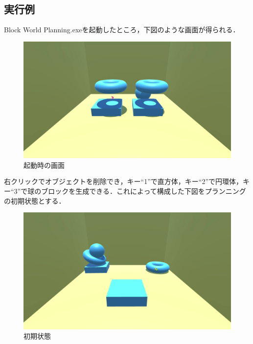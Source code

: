 \documentclass[uplatex,12pt]{jsarticle}
\begin{document}
\clearpage

\subsection{実行例}
Block World Planning.exeを起動したところ，下図のような画面が得られる．

\begin{figure}[!hbt]
  	\begin{center}
  		\includegraphics[scale=0.2]{images/bwp3.jpg}
	\end{center}
  	\caption{起動時の画面}
\end{figure}
\clearpage

右クリックでオブジェクトを削除でき，キー``1''で直方体，キー``2''で円環体，キー``3''で球のブロックを生成できる．これによって構成した下図をプランニングの初期状態とする．

\begin{figure}[!hbt]
  	\begin{center}
  		\includegraphics[scale=0.2]{images/bwp4.jpg}
	\end{center}
  	\caption{初期状態}
\end{figure}
\clearpage
\end{document}
